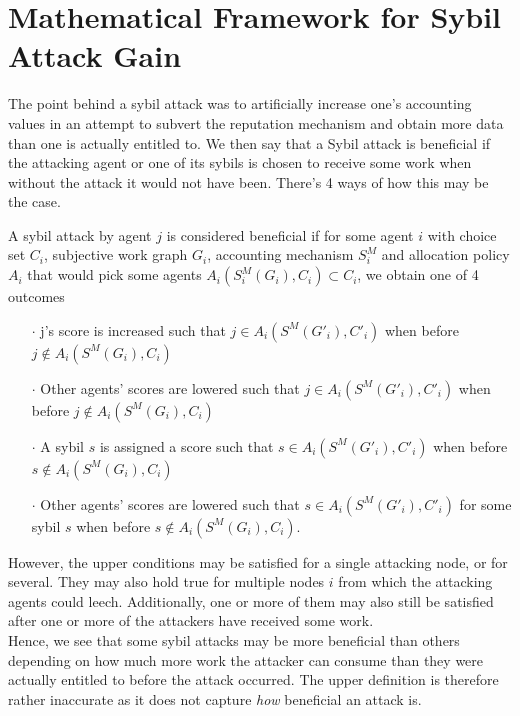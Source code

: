 \chapter{Mathematical Framework for Sybil Attack Gain}
\label{chap:Sybil Attack Gain}
\noindent{}The point behind a sybil attack was to artificially increase one's accounting values in an attempt to subvert the reputation mechanism and obtain more data than one is actually entitled to. We then say that a Sybil attack is beneficial if the attacking agent or one of its sybils is chosen to receive some work when without the attack it would not have been. There's 4 ways of how this may be the case.\vspace{1em}\\ 

\begin{definition}
\label{def:Beneficial Attacks}
\noindent{}A sybil attack by agent $j$ is considered beneficial if for some agent $i$ with choice set $C_i$, subjective work graph $G_i$, accounting mechanism $S_i^M$ and allocation policy $A_i$ that would pick some agents $A_i(S_i^M(G_i),C_i)\subset{}C_i$, we obtain one of 4 outcomes 
\begin{itemize}
\item[$\cdot$] j's score is increased such that $j\in{}A_i(S^M(G'_i),C'_i)$ when before $j\not\in{}A_i(S^M(G_i),C_i)$
\item[$\cdot$] Other agents' scores are lowered such that $j\in{}A_i(S^M(G'_i),C'_i)$ when before $j\not\in{}A_i(S^M(G_i),C_i)$
\item[$\cdot$] A sybil $s$ is assigned a score such that $s\in{}A_i(S^M(G'_i),C'_i)$ when before $s\not\in{}A_i(S^M(G_i),C_i)$
\item[$\cdot$] Other agents' scores are lowered such that $s\in{}A_i(S^M(G'_i),C'_i)$ for some sybil $s$ when before $s\not\in{}A_i(S^M(G_i),C_i)$. \vspace{1em}\\
\end{itemize}
\end{definition}
\noindent{}However, the upper conditions may be satisfied for a single attacking node, or for several. They may also hold true for multiple nodes $i$ from which the attacking agents could leech. Additionally, one or more of them may also still be satisfied after one or more of the attackers have received some work. \vspace{1em}\\

\noindent{}Hence, we see that some sybil attacks may be more beneficial than others depending on how much more work the attacker can consume than they were actually entitled to before the attack occurred. The upper definition is therefore rather inaccurate as it does not capture \textit{how} beneficial an attack is. \vspace{1em}\\


